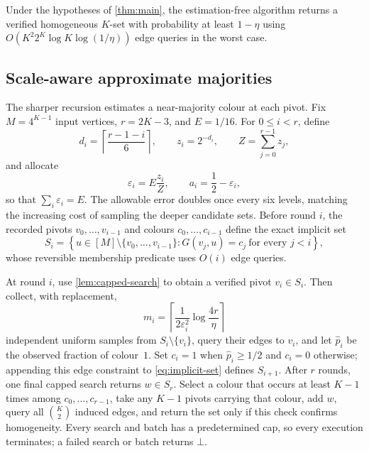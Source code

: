 \begin{proposition}
\label{prop:size-biased-algorithm}
Under the hypotheses of \cref{thm:main}, the estimation-free algorithm returns
a verified homogeneous $K$-set with probability at least $1-\eta$ using
$O(K^2 2^K\log K\log(1/\eta))$ edge queries in the worst case.
\end{proposition}

\subsection{Scale-aware approximate majorities}

The sharper recursion estimates a near-majority colour at each pivot.  Fix
$M=4^{K-1}$ input vertices, $r=2K-3$, and $E=1/16$.  For $0\le i<r$, define
\[
 d_i=\left\lceil\frac{r-1-i}{6}\right\rceil,
 \qquad z_i=2^{-d_i},
 \qquad Z=\sum_{j=0}^{r-1}z_j,
\]
and allocate
\begin{equation}\label{eq:error-schedule}
 \varepsilon_i=E\frac{z_i}{Z},
 \qquad a_i=\frac12-\varepsilon_i,
\end{equation}
so that $\sum_i\varepsilon_i=E$.  The allowable error doubles once every six
levels, matching the increasing cost of sampling the deeper candidate sets.
Before round $i$, the recorded pivots $v_0,\ldots,v_{i-1}$ and colours
$c_0,\ldots,c_{i-1}$ define the exact implicit set
\begin{equation}\label{eq:implicit-set}
 S_i=\left\{
 u\in[M]\setminus\{v_0,\ldots,v_{i-1}\}:
 G(v_j,u)=c_j\ \text{for every }j<i
 \right\},
\end{equation}
whose reversible membership predicate uses $O(i)$ edge queries.

At round $i$, use \cref{lem:capped-search} to obtain a verified pivot
$v_i\in S_i$.  Then collect, with replacement,
\begin{equation}\label{eq:sample-count}
 m_i=\left\lceil
 \frac{1}{2\varepsilon_i^2}\log\frac{4r}{\eta}
 \right\rceil
\end{equation}
independent uniform samples from $S_i\setminus\{v_i\}$, query their edges to
$v_i$, and let $\widehat p_i$ be the observed fraction of colour~$1$.  Set
$c_i=1$ when $\widehat p_i\ge1/2$ and $c_i=0$ otherwise; appending this edge
constraint to \cref{eq:implicit-set} defines $S_{i+1}$.  After $r$ rounds,
one final capped search returns $w\in S_r$.  Select a colour that occurs at
least $K-1$ times among $c_0,\ldots,c_{r-1}$, take any $K-1$ pivots
carrying that colour, add $w$, query all $\binom K2$ induced edges, and
return the set only if this check confirms homogeneity.  Every search and
batch has a predetermined cap, so every execution terminates; a failed
search or batch returns $\bot$.

